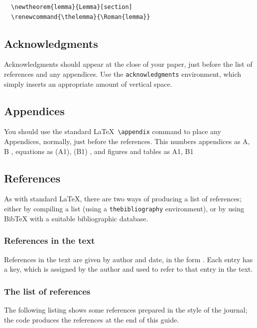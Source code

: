 \smallskip
\begin{verbatim}
  \newtheorem{lemma}{Lemma}[section]
  \renewcommand{\thelemma}{\Roman{lemma}}
\end{verbatim}
\smallskip


\subsection{Acknowledgments}

Acknowledgments should appear at the close of your paper, just before
the list of references and any appendices.  Use the \verb"acknowledgments"
environment, which simply inserts an appropriate amount of vertical space.

\subsection{Appendices}

You should use the standard \LaTeX\ \verb"\appendix" command to place any
Appendices, normally, just before the references. This numbers
appendices as A, B \etc, equations as (A1), (B1) \etc, and figures and
tables as A1, B1 \etc

\subsection{References}

As with standard \LaTeX, there are two ways of producing a list of
references; either by compiling a list (using a \verb"thebibliography"
environment), or by using BibTeX with a suitable bibliographic database.

\subsubsection{References in the text}

References in the text are given by author and date, in the form
\cite{Den85}. Each  entry has a key, which is assigned by the author 
and used to refer to that entry in the text.

\subsubsection{The list of references}

The following listing shows some references prepared in the style of the
journal; the code produces the references at the end of this guide.

